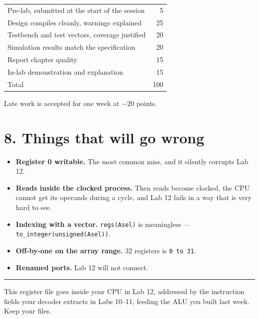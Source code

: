 \documentclass[11pt]{article}
\newcommand{\code}[1]{\texttt{#1}}
\newcommand{\hr}{\vspace{2pt}\hrule\vspace{6pt}}
\begin{document}
\begin{center}
\begin{tabular}{lr}
\toprule
Pre-lab, submitted at the start of the session & 5 \\
Design compiles cleanly, warnings explained & 25 \\
Testbench and test vectors, coverage justified & 20 \\
Simulation results match the specification & 20 \\
Report chapter quality & 15 \\
In-lab demonstration and explanation & 15 \\
\midrule
Total & 100 \\
\bottomrule
\end{tabular}
\end{center}

Late work is accepted for one week at $-20$ points.

\section*{8. Things that will go wrong}

\begin{itemize}[leftmargin=1.6em,itemsep=1pt]
\item \textbf{Register 0 writable.} The most common miss, and it silently
corrupts Lab 12.
\item \textbf{Reads inside the clocked process.} Then reads become clocked, the
CPU cannot get its operands during a cycle, and Lab 12 fails in a way that is
very hard to see.
\item \textbf{Indexing with a vector.} \code{regs(Asel)} is meaningless ---
\code{to\_integer(unsigned(Asel))}.
\item \textbf{Off-by-one on the array range.} 32 registers is \code{0 to 31}.
\item \textbf{Renamed ports.} Lab 12 will not connect.
\end{itemize}

\vspace{10pt}
\hr
{\small This register file goes inside your CPU in Lab 12, addressed by the
instruction fields your decoder extracts in Labs 10--11, feeding the ALU you
built last week. Keep your files.}
\end{document}
